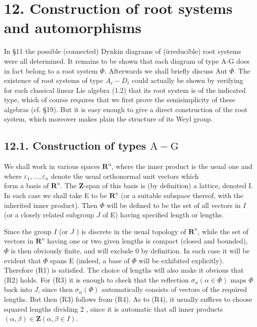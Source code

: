 \documentclass[10pt]{article}
\begin{document}
\section*{12. Construction of root systems and automorphisms}
In §11 the possible (connected) Dynkin diagrams of (irreducible) root systems were all determined. It remains to be shown that each diagram of type A-G does in fact belong to a root system $\Phi$. Afterwards we shall briefly discuss Aut $\Phi$. The existence of root systems of type $A_{\ell}-D_{\ell}$ could actually be shown by verifying for each classical linear Lie algebra (1.2) that its root system is of the indicated type, which of course requires that we first prove the semisimplicity of these algebras (cf. §19). But it is easy enough to give a direct construction of the root system, which moreover makes plain the structure of its Weyl group.

\subsection*{12.1. Construction of types $\mathrm{A}-\mathrm{G}$}
We shall work in various spaces $\mathbf{R}^{n}$, where the inner product is the usual one and where $\varepsilon_{1}, \ldots, \varepsilon_{n}$ denote the usual orthonormal unit vectors which\\
form a basis of $\mathbf{R}^{n}$. The $\mathbf{Z}$-span of this basis is (by definition) a lattice, denoted I. In each case we shall take E to be $\mathbf{R}^{n}$ (or a suitable subspace thereof, with the inherited inner product). Then $\Phi$ will be defined to be the set of all vectors in $I$ (or a closely related subgroup $J$ of E) having specified length or lengths.

Since the group $I$ (or $J$ ) is discrete in the usual topology of $\mathbf{R}^{n}$, while the set of vectors in $\mathbf{R}^{n}$ having one or two given lengths is compact (closed and bounded), $\Phi$ is then obviously finite, and will exclude 0 by definition. In each case it will be evident that $\Phi$ spans E (indeed, a base of $\Phi$ will be exhibited explicitly). Therefore (R1) is satisfied. The choice of lengths will also make it obvious that (R2) holds. For (R3) it is enough to check that the reflection $\sigma_{\alpha}(\alpha \in \Phi)$ maps $\Phi$ back into $J$, since then $\sigma_{\alpha}(\Phi)$ automatically consists of vectors of the required lengths. But then (R3) follows from (R4). As to (R4), it usually suffices to choose squared lengths dividing 2 , since it is automatic that all inner products $(\alpha, \beta) \in \mathbf{Z}(\alpha, \beta \in I)$.
\end{document}
